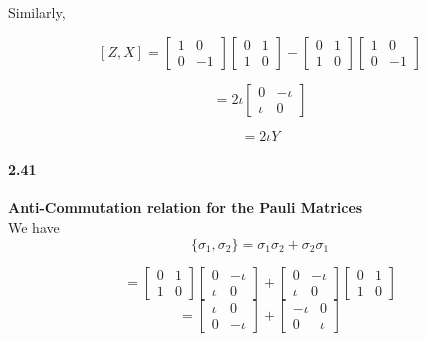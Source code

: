  Similarly,

 $$[Z,X] = \begin{bmatrix}
     1 & 0 \\ 0 & -1
 \end{bmatrix} \begin{bmatrix}
     0 & 1 \\ 1 & 0
 \end{bmatrix}
 - \begin{bmatrix}
     0 & 1 \\ 1 & 0
 \end{bmatrix} \begin{bmatrix}
     1 & 0 \\ 0 & -1
 \end{bmatrix}$$

 $$ = 2\iota \begin{bmatrix}
     0 &-\iota \\ \iota & 0
 \end{bmatrix}$$

 $$ = 2\iota Y$$

 \paragraph{2.41} \textbf{Anti-Commutation relation for the Pauli Matrices} \\%

 We have 
 $$ \{\sigma_1, \sigma_2\}  = \sigma_1 \sigma_2 + \sigma_2 \sigma_1$$

 $$ = \begin{bmatrix}
    0 & 1 \\ 1 & 0
\end{bmatrix} \begin{bmatrix}
    0 & -\iota \\ \iota & 0
\end{bmatrix} + \begin{bmatrix}
    0 & -\iota \\ \iota & 0
\end{bmatrix} \begin{bmatrix}
    0 & 1 \\ 1 & 0
\end{bmatrix}$$
$$ = \begin{bmatrix}
    \iota & 0 \\ 0 & -\iota
\end{bmatrix} + \begin{bmatrix}
    -\iota & 0 \\ 0 & \iota
\end{bmatrix}$$

